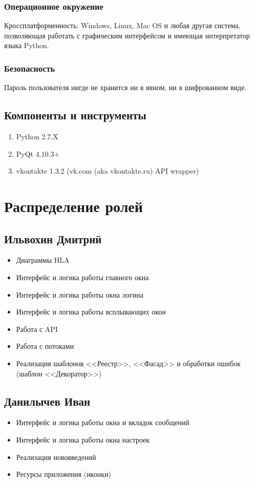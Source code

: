 \documentclass[12pt]{article}
\begin{document}
\subsubsection{Операционное окружение}
Кроссплатформенность: Windows, Linux, Mac OS и любая другая система, позволяющая работать с графическим интерфейсом и имеющая интерпретатор языка Python.

\subsubsection{Безопасность}
Пароль пользователя нигде не хранится ни в явном, ни в шифрованном виде.

\subsection{Компоненты и инструменты} 
\begin{enumerate}
\item Python 2.7.X
\item PyQt 4.10.3+
\item vkontakte 1.3.2 (vk.com (aka vkontakte.ru) API wrapper)
\end{enumerate}



\newpage
\section{Распределение ролей}
\subsection{Ильвохин Дмитрий}
\begin{itemize}
\setlength{\itemsep}{-1mm} %
\item Диаграммы HLA
\item Интерфейс и логика работы главного окна
\item Интерфейс и логика работы окна логина
\item Интерфейс и логика работы всплывающих окон
\item Работа с API
\item Работа с потоками
\item Реализация шаблонов <<Реестр>>, <<Фасад>> и обработки ошибок (шаблон <<Декоратор>>)
\end{itemize}

\subsection{Данилычев Иван}
\begin{itemize}
\setlength{\itemsep}{-1mm}
\item Интерфейс и логика работы окна и вкладок сообщений
\item Интерфейс и логика работы окна настроек
\item Реализация нововведений
\item Ресурсы приложения (иконки)
\end{itemize}
\end{document}
